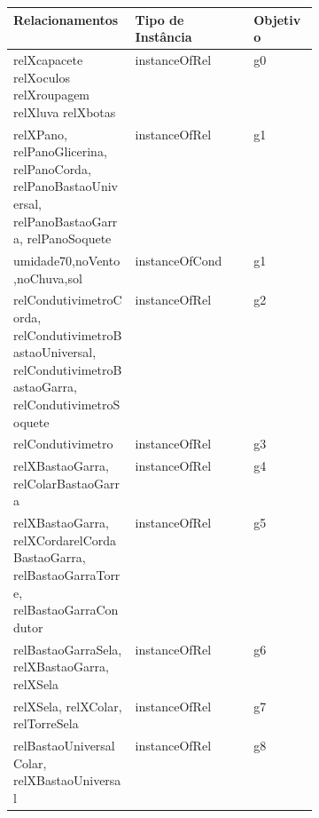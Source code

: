 \begin{center}
\begin{longtable}[H]{|p{0.4\linewidth}|l|l|}
\hline
\textbf{Relacionamentos}																									& \textbf{Tipo de Instância}          & \textbf{Objetivo} \\ \hline
relXcapacete relXoculos relXroupagem relXluva relXbotas                                                                                                                                                                                                                                                                    & instanceOfRel              		 & g0         \\ \hline
relXPano, relPanoGlicerina, relPanoCorda, relPanoBastaoUniversal, relPanoBastaoGarra, relPanoSoquete                             						& instanceOfRel                       & g1         \\ \hline
umidade70,noVento,noChuva,sol 																														& instanceOfCond					  & g1        \\ \hline
relCondutivimetroCorda, relCondutivimetroBastaoUniversal, relCondutivimetroBastaoGarra, relCondutivimetroSoquete               						& instanceOfRel              		 & g2         \\ \hline
relCondutivimetro                                                                                                           						& instanceOfRel              		 & g3         \\ \hline
relXBastaoGarra, relColarBastaoGarra                                                                                         						& instanceOfRel              		 & g4         \\ \hline
relXBastaoGarra, relXCordarelCordaBastaoGarra, relBastaoGarraTorre, relBastaoGarraCondutor                                     						& instanceOfRel              		 & g5         \\ \hline
relBastaoGarraSela, relXBastaoGarra, relXSela                                                                                 						& instanceOfRel              		 & g6         \\ \hline
relXSela, relXColar, relTorreSela                                                                                             						& instanceOfRel              		 & g7         \\ \hline
relBastaoUniversalColar, relXBastaoUniversal                                                                                 						& instanceOfRel              		 & g8         \\ \hline

\end{longtable}
\end{center}
